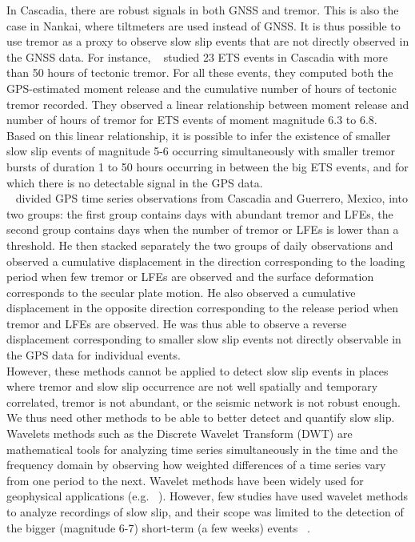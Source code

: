 \documentclass{article}
\begin{document}
In Cascadia, there are robust signals in both GNSS and tremor. This is also the case in Nankai, where tiltmeters are used instead of GNSS. It is thus possible to use tremor as a proxy to observe slow slip events that are not directly observed in the GNSS data. For instance, ~\citet{AGU_2009} studied 23 ETS events in Cascadia with more than 50 hours of tectonic tremor. For all these events, they computed both the GPS-estimated moment release and the cumulative number of hours of tectonic tremor recorded. They observed a linear relationship between moment release and number of hours of tremor for ETS events of moment magnitude 6.3 to 6.8. Based on this linear relationship, it is possible to infer the existence of smaller slow slip events of magnitude 5-6 occurring simultaneously with smaller tremor bursts of duration 1 to 50 hours occurring in between the big ETS events, and for which there is no detectable signal in the GPS data. \\

~\citet{FRA_2016} divided GPS time series observations from Cascadia and Guerrero, Mexico, into two groups: the first group contains days with abundant tremor and LFEs, the second group contains days when the number of tremor or LFEs is lower than a threshold. He then stacked separately the two groups of daily observations and observed a cumulative displacement in the direction corresponding to the loading period when few tremor or LFEs are observed and the surface deformation corresponds to the secular plate motion. He also observed a cumulative displacement in the opposite direction corresponding to the release period when tremor and LFEs are observed. He was thus able to observe a reverse displacement corresponding to smaller slow slip events not directly observable in the GPS data for individual events. \\

However, these methods cannot be applied to detect slow slip events in places where tremor and slow slip occurrence are not well spatially and temporary correlated, tremor is not abundant, or the seismic network is not robust enough. We thus need other methods to be able to better detect and quantify slow slip. \\

Wavelets methods such as the Discrete Wavelet Transform (DWT) are mathematical tools for analyzing time series simultaneously in the time and the frequency domain by observing how weighted differences of a time series vary from one period to the next. Wavelet methods have been widely used for geophysical applications (e.g. ~\citep{KUM_1997}). However, few studies have used wavelet methods to analyze recordings of slow slip, and their scope was limited to the detection of the bigger (magnitude 6-7) short-term (a few weeks) events ~\citep{SZE_2008,OHT_2010,WEI_2012,ALB_2019}. \\
\end{document}
